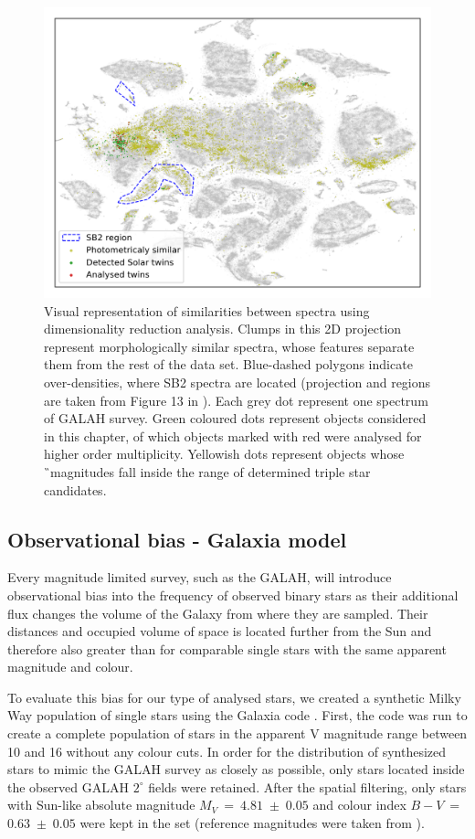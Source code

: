 \begin{figure}
	\centering
	\includegraphics[width=\textwidth]{evaluated_all_tsne.png}
	\caption{Visual representation of similarities between spectra using dimensionality reduction analysis. Clumps in this 2D projection represent morphologically similar spectra, whose features separate them from the rest of the data set. Blue-dashed polygons indicate over-densities, where SB2 spectra are located (projection and regions are taken from Figure 13 in \citet{buder2018}). Each grey dot represent one spectrum of GALAH survey. Green coloured dots represent objects considered in this chapter, of which objects marked with red were analysed for higher order multiplicity. Yellowish dots represent objects whose \G\ magnitudes fall inside the range of determined triple star candidates.}
	\label{fig:tsne_marked}
\end{figure}

\subsection{Observational bias - Galaxia model}
\label{sec:bias}
Every magnitude limited survey, such as the GALAH, will introduce observational bias into the frequency of observed binary stars as their additional flux changes the volume of the Galaxy from where they are sampled. Their distances and occupied volume of space is located further from the Sun and therefore also greater than for comparable single stars with the same apparent magnitude and colour.

To evaluate this bias for our type of analysed stars, we created a synthetic Milky Way population of single stars using the Galaxia code \cite{2011ApJ...730....3S}. First, the code was run to create a complete population of stars in the apparent V magnitude range between 10 and 16 without any colour cuts. In order for the distribution of synthesized stars to mimic the GALAH survey as closely as possible, only stars located inside the observed GALAH $2^\circ$ fields were retained. After the spatial filtering, only stars with Sun-like absolute magnitude $M_V~=~4.81$~$\pm$~$0.05$ and colour index $B-V$~=~$0.63$~$\pm$~$0.05$ were kept in the set (reference magnitudes were taken from \citet{2018ApJS..236...47W}).

